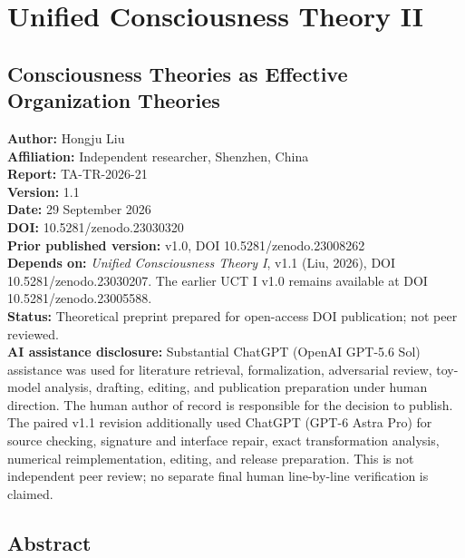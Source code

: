 \documentclass[
  11pt,
  a4paper,
]{article}
\author{}
\date{}
\begin{document}
\hypertarget{unified-consciousness-theory-ii}{%
\section{Unified Consciousness Theory
II}\label{unified-consciousness-theory-ii}}

\hypertarget{consciousness-theories-as-effective-organization-theories}{%
\subsection{Consciousness Theories as Effective Organization
Theories}\label{consciousness-theories-as-effective-organization-theories}}

\textbf{Author:} Hongju Liu\\
\textbf{Affiliation:} Independent researcher, Shenzhen, China\\
\textbf{Report:} TA-TR-2026-21\\
\textbf{Version:} 1.1\\
\textbf{Date:} 29 September 2026\\
\textbf{DOI:} 10.5281/zenodo.23030320\\
\textbf{Prior published version:} v1.0, DOI 10.5281/zenodo.23008262\\
\textbf{Depends on:} \emph{Unified Consciousness Theory I}, v1.1 (Liu,
2026), DOI 10.5281/zenodo.23030207. The earlier UCT I v1.0 remains
available at DOI 10.5281/zenodo.23005588.\\
\textbf{Status:} Theoretical preprint prepared for open-access DOI
publication; not peer reviewed.\\
\textbf{AI assistance disclosure:} Substantial ChatGPT (OpenAI GPT-5.6
Sol) assistance was used for literature retrieval, formalization,
adversarial review, toy-model analysis, drafting, editing, and
publication preparation under human direction. The human author of
record is responsible for the decision to publish. The paired v1.1
revision additionally used ChatGPT (GPT-6 Astra Pro) for source
checking, signature and interface repair, exact transformation analysis,
numerical reimplementation, editing, and release preparation. This is
not independent peer review; no separate final human line-by-line
verification is claimed.

\hypertarget{abstract}{%
\subsection{Abstract}\label{abstract}}
\end{document}
